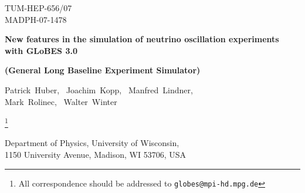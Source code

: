 \documentclass[12pt,a4paper]{article}
\begin{document}

\begin{titlepage}

\renewcommand{\thefootnote}{\alph{footnote}}

\vspace*{-3.cm}
\begin{flushright}
TUM-HEP-656/07\\
MADPH-07-1478\\
\end{flushright}

\vspace*{0.5cm}

\renewcommand{\thefootnote}{\fnsymbol{footnote}}
\setcounter{footnote}{-1}

{\begin{center}
{\Large\bf New features in the simulation of neutrino oscillation experiments with GLoBES 3.0}


\end{center}}
{\begin{center}
{\large\bf (General Long Baseline Experiment Simulator)}
\end{center}}
\renewcommand{\thefootnote}{\alph{footnote}}

\vspace*{.8cm}
{\begin{center} {\large{\sc
                Patrick~Huber\footnotemark[1],~
                Joachim~Kopp\footnotemark[2],~
                Manfred~Lindner\footnotemark[2], \\
                Mark~Rolinec\footnotemark[3],~
                Walter~Winter\footnotemark[4]
                }}

\footnote{All correspondence should be addressed to {\tt globes@mpi-hd.mpg.de}}

\end{center}}
\vspace*{0cm}
{\it
\begin{center}

\footnotemark[1]%
       Department of Physics, University of Wisconsin, \\
       1150 University Avenue, Madison, WI 53706, USA


\end{center}}
\end{titlepage}
\end{document}
